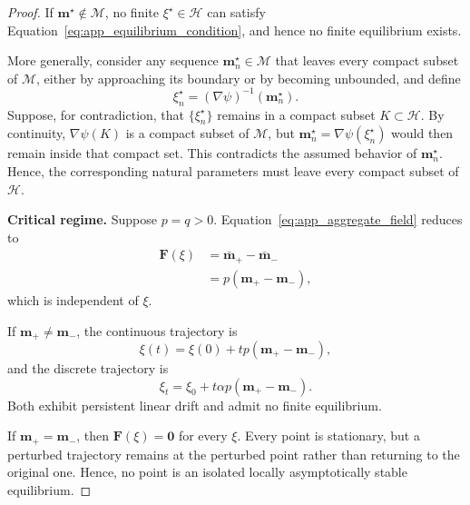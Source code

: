 \documentclass{article}
\theoremstyle{plain}
\theoremstyle{definition}
\theoremstyle{remark}
\begin{document}
\begin{proof}
If \(\mathbf m^\star\notin\mathcal M\), no finite
\(\xi^\star\in\mathcal H\) can satisfy
Equation~\eqref{eq:app_equilibrium_condition}, and hence no finite
equilibrium exists.

More generally, consider any sequence
\(\mathbf m^\star_n\in\mathcal M\) that leaves every compact subset of
\(\mathcal M\), either by approaching its boundary or by becoming
unbounded, and define
\begin{equation}
    \xi^\star_n
    =
    (\nabla\psi)^{-1}
    \left(
        \mathbf m^\star_n
    \right).
\end{equation}
Suppose, for contradiction, that
\(\{\xi^\star_n\}\) remains in a compact subset
\(K\subset\mathcal H\). By continuity,
\(\nabla\psi(K)\) is a compact subset of \(\mathcal M\), but
\(\mathbf m^\star_n=\nabla\psi(\xi^\star_n)\) would then remain inside
that compact set. This contradicts the assumed behavior of
\(\mathbf m^\star_n\). Hence, the corresponding natural parameters must
leave every compact subset of \(\mathcal H\).

\medskip
\noindent\textbf{Critical regime.}
Suppose \(p=q>0\). Equation~\eqref{eq:app_aggregate_field} reduces to
\begin{equation}
\begin{aligned}
    \mathbf F(\xi)
    &=
    \bar{\mathbf m}_+
    -
    \bar{\mathbf m}_-
    \\
    &=
    p
    \left(
        \mathbf m_+
        -
        \mathbf m_-
    \right),
\end{aligned}
\label{eq:app_critical_field}
\end{equation}
which is independent of \(\xi\).

If \(\mathbf m_+\neq\mathbf m_-\), the continuous trajectory is
\begin{equation}
    \xi(t)
    =
    \xi(0)
    +
    tp
    \left(
        \mathbf m_+
        -
        \mathbf m_-
    \right),
    \label{eq:app_critical_continuous}
\end{equation}
and the discrete trajectory is
\begin{equation}
    \xi_t
    =
    \xi_0
    +
    t\alpha p
    \left(
        \mathbf m_+
        -
        \mathbf m_-
    \right).
    \label{eq:app_critical_discrete}
\end{equation}
Both exhibit persistent linear drift and admit no finite equilibrium.

If \(\mathbf m_+=\mathbf m_-\), then
\(\mathbf F(\xi)=\mathbf 0\) for every \(\xi\). Every point is
stationary, but a perturbed trajectory remains at the perturbed point
rather than returning to the original one. Hence, no point is an
isolated locally asymptotically stable equilibrium.


\end{proof}
\end{document}
